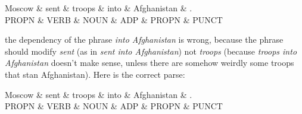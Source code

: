 \begin{parts}
\begin{center}
 {
 \begin{dependency}
 \begin{deptext}
Moscow  \& sent \& troops \& into  \& Afghanistan \& .     \\
 PROPN \& VERB  \& NOUN  \& ADP \& PROPN \& PUNCT \\
 \end{deptext}
 \end{dependency}
 }
 \end{center}

the dependency of the phrase \emph{into Afghanistan} is wrong, because the phrase should modify \emph{sent} (as in \textit{sent into Afghanistan}) not \emph{troops} (because \textit{troops into Afghanistan} doesn't make sense, unless there are somehow weirdly some troops that stan Afghanistan). Here is the correct parse:

\begin{center}
 {
 \begin{dependency}
 \begin{deptext}
Moscow  \& sent \& troops \& into  \& Afghanistan \& .     \\
 PROPN \& VERB  \& NOUN  \& ADP \& PROPN \& PUNCT \\
 \end{deptext}
 \end{dependency}
 }
 \end{center}


\end{parts}
